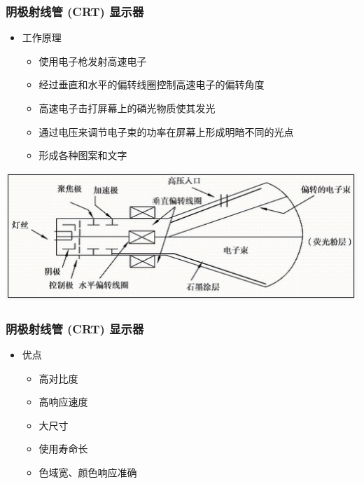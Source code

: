\documentclass{beamer}
\newcommand{\fullPageImage}[2]{
	{
		\usebackgroundtemplate{\texttt{[image: \#1]}}
		\frame[plain]{#2}
	}
}
\begin{document}
\begin{frame}
	\frametitle{阴极射线管 (CRT) 显示器}
	\begin{itemize}
		\item 工作原理
		\begin{itemize}
			\item 使用电子枪发射高速电子
			\item 经过垂直和水平的偏转线圈控制高速电子的偏转角度
			\item 高速电子击打屏幕上的磷光物质使其发光
			\item 通过电压来调节电子束的功率在屏幕上形成明暗不同的光点
			\item 形成各种图案和文字
		\end{itemize}
	\end{itemize}
	\begin{center}
	\includegraphics[height=.4\textheight]{images/crt-working-flow.jpg}
	\end{center}
\end{frame}

\fullPageImage{images/750px-CRT_color_enhanced.png}{\transwipe}%
\fullPageImage{images/800px-CRTV.jpg}{\transwipe}%
\fullPageImage{images/717px-Crt14.jpg}{\transwipe}%

\fullPageImage{images/crt-structure.jpg}{\transwipe}

\begin{frame}
	\frametitle{阴极射线管 (CRT) 显示器}
	\begin{itemize}
		\item 优点
		\begin{itemize}
			\item 高对比度
		    \item 高响应速度
		    \item 大尺寸
		    \item 使用寿命长
		    \item 色域宽、颜色响应准确
		\end{itemize}
	\end{itemize}
\end{frame}
\end{document}
